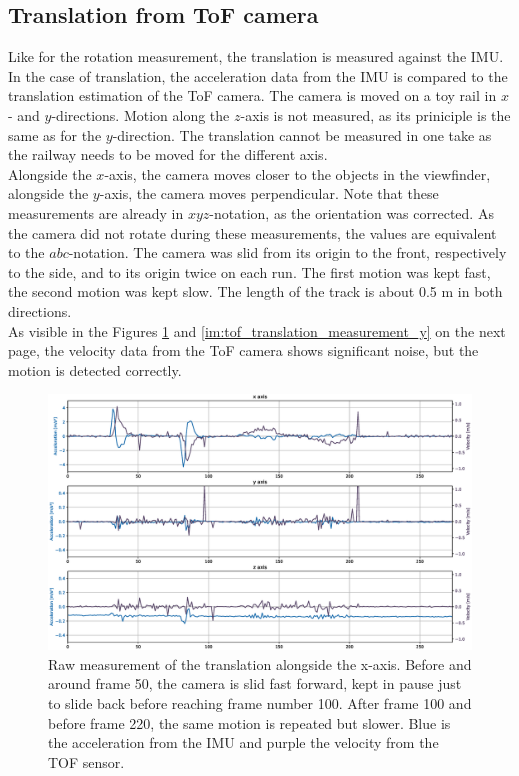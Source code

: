 \subsection{Translation from ToF camera}
\label{sec:translation_tof_rotation}
Like for the rotation measurement, the translation is measured against the IMU. In the case of translation, the acceleration data from the IMU is compared to the translation estimation of the ToF camera. The camera is moved on a toy rail in $x$- and $y$-directions. Motion along the $z$-axis is not measured, as its priniciple is the same as for the $y$-direction. The translation cannot be measured in one take as the railway needs to be moved for the different axis.\\
Alongside the $x$-axis, the camera moves closer to the objects in the viewfinder, alongside the $y$-axis, the camera moves perpendicular. Note that these measurements are already in $xyz$-notation, as the orientation was corrected. As the camera did not rotate during these measurements, the values are equivalent to the $abc$-notation. The camera was slid from its origin to the front, respectively to the side, and to its origin twice on each run. The first motion was kept fast, the second motion was kept slow. The length of the track is about 0.5 m in both directions.\\
As visible in the Figures \ref{im:tof_translation_measurement_x} and \ref{im:tof_translation_measurement_y} on the next page, the velocity data from the ToF camera shows significant noise, but the motion is detected correctly.
\begin{figure}[H]
  \centering
  \includegraphics[width=1.0\textwidth]{images/tof_translation_measurement_x.eps}
  \caption{Raw measurement of the translation alongside the x-axis. Before and around frame 50, the camera is slid fast forward, kept in pause just to slide back before reaching frame number 100. After frame 100 and before frame 220, the same motion is repeated but slower. Blue is the acceleration from the IMU and purple the velocity from the TOF sensor.}
  \label{im:tof_translation_measurement_x}
\end{figure}
